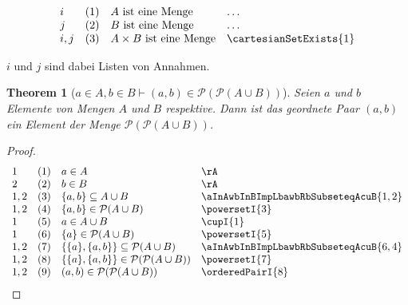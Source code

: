 \documentclass{book}
\theoremstyle{plain}
\newtheorem{theorem}{Theorem}
\theoremstyle{remark}
\theoremstyle{definition}
\begin{document}
\[
\begin{array}{llll}
	i & (1) & A \text{ ist eine Menge} & \dots  \\
        j & (2) & B \text{ ist eine Menge} & \dots  \\
	i,j & (3) & A\times B\text{ ist eine Menge} & \cartesianSetExists{1} \\
\end{array}
\]

\(i\) und \(j\) sind dabei Listen von Annahmen.


\label{aInAwbInBImpLpawbRpInPowersetLpPowersetLpAcuBRpRp}
\begin{theorem}[\(a\in A, b\in B \vdash (a,b)\in \mathcal{P}(\mathcal{P}(A \cup B))\)]
    Seien \( a \) und \( b \) Elemente von Mengen \( A \) und \( B \) respektive. Dann ist das geordnete Paar \( (a, b) \) ein Element der Menge \(\mathcal{P}(\mathcal{P}(A \cup B))\). 
\end{theorem}
\begin{proof}
	\[
	\begin{array}{llll}
		1 & (1) & a\in A & \rA \\
		2 & (2) & b\in B & \rA \\
		1,2 & (3) & \{a,b\}\subseteq A\cup B & \aInAwbInBImpLbawbRbSubseteqAcuB{1,2} \\
		1,2 & (4) & \{a,b\}\in \mathcal{P}(A\cup B) & \powersetI{3} \\
		1 & (5) & a\in A\cup B & \cupI{1} \\
		1 & (6) & \{a\}\in \mathcal{P}(A\cup B) & \powersetI{5} \\
		1,2 & (7) & \{\{a\},\{a,b\}\}\subseteq \mathcal{P}(A\cup B) & \aInAwbInBImpLbawbRbSubseteqAcuB{6,4} \\
		1,2 & (8) & \{\{a\},\{a,b\}\}\in \mathcal{P}(\mathcal{P}(A\cup B)) & \powersetI{7} \\
		1,2 & (9) & (a,b)\in \mathcal{P}(\mathcal{P}(A\cup B)) & \orderedPairI{8} \\
	\end{array}
	\]
\end{proof}
\end{document}

